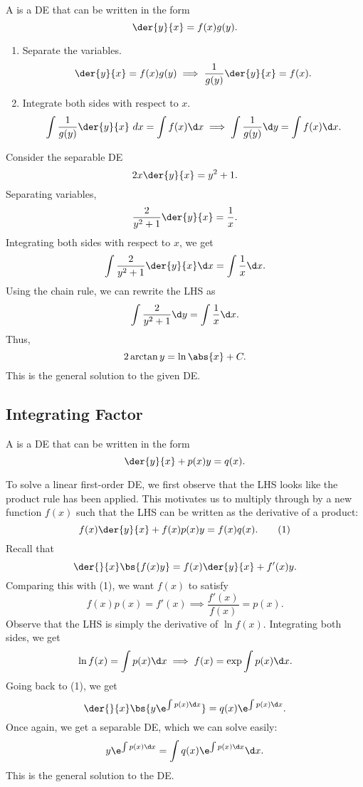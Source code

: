 \begin{definition}
    A  is a DE that can be written in the form \[\der{y}{x} = f(x) g(y).\]
\end{definition}

\begin{recipe}
    \phantom{.}
    \renewcommand{\theenumi}{\arabic{enumi}.}%
    \begin{enumerate}
        \item Separate the variables. \[\der{y}{x} = f(x) g(y) \implies \frac1{g(y)} \der{y}{x} = f(x).\]
        \item Integrate both sides with respect to $x$. \[\int \frac1{g(y)} \der{y}{x} \ d x = \int f(x) \d x \implies \int \frac1{g(y)} \d y = \int f(x) \d x.\]
    \end{enumerate}
    \renewcommand{\theenumi}{(\alph{enumi})}
\end{recipe}

\begin{example}
    Consider the separable DE \[2x \der{y}{x} = y^2 + 1.\] Separating variables, \[\frac2{y^2 + 1} \der{y}{x} = \frac1{x}.\] Integrating both sides with respect to $x$, we get \[\int \frac2{y^2 + 1} \der{y}{x} \d x = \int \frac1{x} \d x.\] Using the chain rule, we can rewrite the LHS as \[\int \frac2{y^2 + 1} \d y = \int \frac1{x} \d x.\] Thus, \[2\arctan y = \ln \abs{x} + C.\] This is the general solution to the given DE.
\end{example}

\subsection{Integrating Factor}

\begin{definition}
    A  is a DE that can be written in the form \[\der{y}{x} + p(x) y = q(x).\]
\end{definition}

To solve a linear first-order DE, we first observe that the LHS looks like the product rule has been applied. This motivates us to multiply through by a new function $f(x)$ such that the LHS can be written as the derivative of a product: \[f(x) \der{y}{x} + f(x) p(x) y = f(x) q(x). \tag{1}\] Recall that \[\der{}{x} \bs{f(x) y} = f(x) \der{y}{x} + f'(x) y.\] Comparing this with (1), we want $f(x)$ to satisfy \[f(x) p(x) = f'(x) \implies \frac{f'(x)}{f(x)} = p(x).\] Observe that the LHS is simply the derivative of $\ln f(x)$. Integrating both sides, we get \[\ln f(x) = \int p(x) \d x \implies f(x) = \exp \int p(x) \d x.\] Going back to (1), we get \[\der{}{x} \bs{y \e^{\int p(x) \d x}} = q(x) \e^{\int p(x) \d x}.\] Once again, we get a separable DE, which we can solve easily: \[y \e^{\int p(x) \d x} = \int q(x) \e^{\int p(x) \d x} \d x.\] This is the general solution to the DE.

